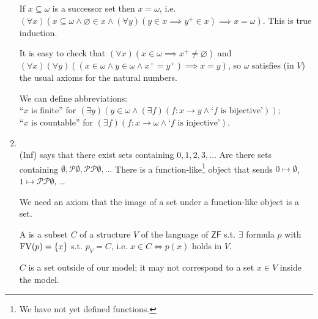 \begin{enumerate}
    If $x \subseteq \omega$ is a successor set then $x = \omega$, i.e. $(\forall x)(x \subseteq \omega \wedge \varnothing \in x \wedge (\forall y)(y \in x \implies y^+ \in x) \implies x = \omega)$.
    This is true induction.

    It is easy to check that $(\forall x)(x \in \omega \implies x^+ \neq \varnothing)$ and $(\forall x)(\forall y)((x \in \omega \wedge y \in \omega \wedge x^+ = y^+) \implies x = y)$, so $\omega$ satisfies (in $V$) the usual axioms for the natural numbers.

    We can define abbreviations: \\
    ``$x$ is finite'' for $(\exists y)(y \in \omega \wedge (\exists f)(f : x \to y \wedge \text{`$f$ is bijective'}))$; \\
    ``$x$ is countable'' for $(\exists f)(f : x \to \omega \wedge \text{`$f$ is injective'})$.

    \item {} \\
    (Inf) says that there exist sets containing $0, 1, 2, 3, \dots$
    Are there sets containing $\emptyset, \mathcal{P}\emptyset, \mathcal{P}\mathcal{P}\emptyset, \dots$
    There is a function-like\footnote{We have not yet defined functions.} object that sends $0 \mapsto \emptyset$, $1 \mapsto \mathcal{P}\mathcal{P}\emptyset$, \dots

    We need an axiom that the image of a set under a function-like object is a set.


    \begin{definition}[Class]
        A  is a subset $C$ of a structure $V$ of the language of $\mathsf{ZF}$ s.t. $\exists$ formula $p$ with $\operatorname{FV}(p) = \{x\}$ s.t. $p_V = C$, i.e. $x \in C \iff p(x)$ holds in $V$.
    \end{definition}

    $C$ is a set outside of our model; it may not correspond to a set $x \in V$ inside the model.


\end{enumerate}
